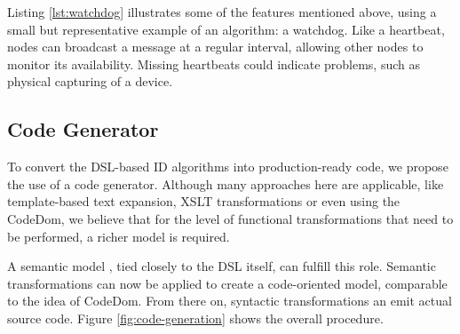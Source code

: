 \documentclass[conference]{IEEEtran}
\newcommand{\NAME}{id-foo\xspace}
\begin{document}
Listing \ref{lst:watchdog} illustrates some of the features mentioned above,
using a small but representative example of an algorithm: a
watchdog\cite{mishra2004intrusion}. Like a heartbeat, nodes can broadcast a
message at a regular interval, allowing other nodes to monitor its
availability. Missing heartbeats could indicate problems, such as physical
capturing of a device.




\subsection{Code Generator}

To convert the DSL-based ID algorithms into production-ready code, we propose
the use of a code generator. Although many approaches here are applicable, like
template-based text expansion, XSLT transformations or even using the
CodeDom\cite{dollard2004code}, we believe that for the level of functional
transformations that need to be performed, a richer model is required.

A semantic model \cite{fowler2010domain}, tied closely to the DSL itself, can
fulfill this role. Semantic transformations can now be applied to create a
code-oriented model, comparable to the idea of CodeDom. From there on,
syntactic transformations an emit actual source code. Figure
\ref{fig:code-generation} shows the overall procedure.
\end{document}
